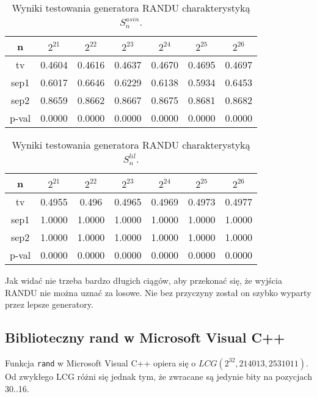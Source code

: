 \documentclass[a4paper,11pt,twoside]{book}
\newcommand{\Slil}[1]{S^{lil}_#1}
\newcommand{\Sasin}[1]{S^{asin}_#1}
\theoremstyle{definition}
\begin{document}
\begin{table}[ht!]
\centering
 \caption{Wyniki testowania generatora RANDU charakterystyką $\Sasin{n}$.}
 \label{tab:randu_asin}
\begin{tabular} {||c|c|c|c|c|c|c||}  
 \hline 
     n &  $2^{21}$ &  $2^{22}$ &  $2^{23}$ &  $2^{24}$ &  $2^{25}$ &  $2^{26}$\\ \hline
     tv &  0.4604 &  0.4616 &  0.4637 &  0.4670 &  0.4695 &  0.4697\\ \hline
   sep1 &  0.6017 &  0.6646 &  0.6229 &  0.6138 &  0.5934 &  0.6453\\ \hline
   sep2 &  0.8659 &  0.8662 &  0.8667 &  0.8675 &  0.8681 &  0.8682\\ \hline
  p-val &  0.0000 &  0.0000 &  0.0000 &  0.0000 &  0.0000 &  0.0000\\ \hline
\end{tabular}  
\end{table}

\begin{table}[ht!]
\centering
 \caption{Wyniki testowania generatora RANDU charakterystyką $\Slil{n}$.}
 \label{tab:randu_lil}
\begin{tabular} {||c|c|c|c|c|c|c||}  
 \hline 
     n &  $2^{21}$ &  $2^{22}$ &  $2^{23}$ &  $2^{24}$ &  $2^{25}$ &  $2^{26}$\\ \hline
     tv &  0.4955 &   0.496 &  0.4965 &  0.4969 &  0.4973 &  0.4977\\ \hline
   sep1 &  1.0000 &  1.0000 &  1.0000 &  1.0000 &  1.0000 &  1.0000\\ \hline
   sep2 &  1.0000 &  1.0000 &  1.0000 &  1.0000 &  1.0000 &  1.0000\\ \hline
  p-val &  0.0000 &  0.0000 &  0.0000 &  0.0000 &  0.0000 &  0.0000\\ \hline
\end{tabular}  
\end{table}

Jak widać nie trzeba bardzo długich ciągów, aby przekonać się, że wyjścia RANDU nie można uznać za losowe. Nie bez przyczyny został on szybko wyparty przez lepsze generatory.

\FloatBarrier
\subsection{Biblioteczny rand w Microsoft Visual C++}
Funkcja \texttt{rand} w Microsoft Visual C++ opiera się o $LCG(2^{32}, 214013, 2531011)$. Od zwykłego LCG różni się jednak tym, że zwracane są jedynie bity na pozycjach 30..16. 
\end{document}
